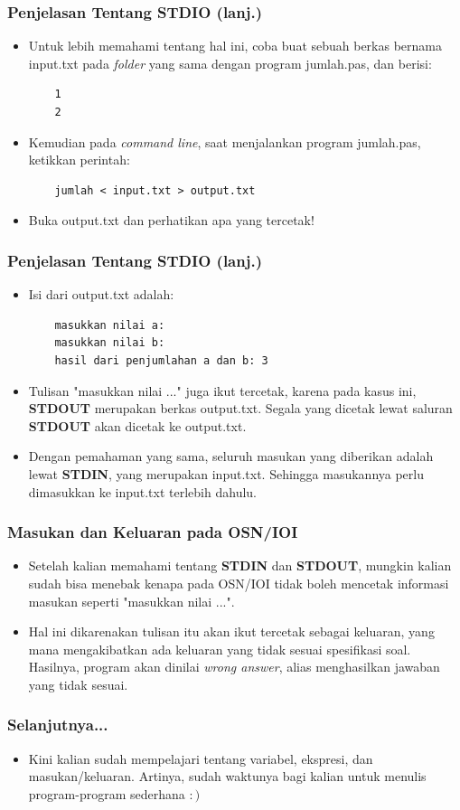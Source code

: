\documentclass{beamer}
\begin{document}
\begin{frame}[fragile]
\frametitle{Penjelasan Tentang STDIO (lanj.)}
\begin{itemize}
  \item Untuk lebih memahami tentang hal ini, coba buat sebuah berkas bernama input.txt pada \textit{folder} yang sama dengan program jumlah.pas, dan berisi:
  \begin{lstlisting}
    1
    2
  \end{lstlisting}
  \item Kemudian pada \textit{command line}, saat menjalankan program jumlah.pas, ketikkan perintah:
  \begin{lstlisting}
    jumlah < input.txt > output.txt
  \end{lstlisting}
  \item Buka output.txt dan perhatikan apa yang tercetak!
\end{itemize}
\end{frame}

\begin{frame}[fragile]
\frametitle{Penjelasan Tentang STDIO (lanj.)}
\begin{itemize}
  \item Isi dari output.txt adalah:
  \begin{lstlisting}
    masukkan nilai a:
    masukkan nilai b:
    hasil dari penjumlahan a dan b: 3
  \end{lstlisting}
  \item Tulisan "masukkan nilai ..." juga ikut tercetak, karena pada kasus ini, \textbf{STDOUT} merupakan berkas output.txt. Segala yang dicetak lewat saluran \textbf{STDOUT} akan dicetak ke output.txt.
  \item Dengan pemahaman yang sama, seluruh masukan yang diberikan adalah lewat \textbf{STDIN}, yang merupakan input.txt. Sehingga masukannya perlu dimasukkan ke input.txt terlebih dahulu.
\end{itemize}
\end{frame}

\begin{frame}
\frametitle{Masukan dan Keluaran pada OSN/IOI}
\begin{itemize}
  \item Setelah kalian memahami tentang \textbf{STDIN} dan \textbf{STDOUT}, mungkin kalian sudah bisa menebak kenapa pada OSN/IOI tidak boleh mencetak informasi masukan seperti "masukkan nilai ...".
  \item Hal ini dikarenakan tulisan itu akan ikut tercetak sebagai keluaran, yang mana mengakibatkan ada keluaran yang tidak sesuai spesifikasi soal. Hasilnya, program akan dinilai \alert{\textit{wrong answer}}, alias menghasilkan jawaban yang tidak sesuai.
\end{itemize}
\end{frame}

\begin{frame}
\frametitle{Selanjutnya...}
\begin{itemize}
  \item Kini kalian sudah mempelajari tentang variabel, ekspresi, dan masukan/keluaran. Artinya, sudah waktunya bagi kalian untuk menulis program-program sederhana $:)$
\end{itemize}
\end{frame}
\end{document}
